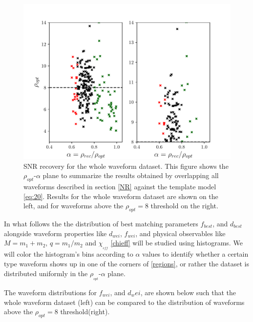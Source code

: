 \begin{figure}[hbt!]
\begin{center}
\includegraphics[width=\textwidth, angle=0]{images/Data_analysis/results/alpha_scatter.pdf}
\captionsetup{width=0.8\textwidth}
\caption[SNR recovery for the whole waveform dataset]{SNR recovery for the whole waveform dataset. This figure shows the $\rho_{opt}$-$\alpha$ plane to summarize the results obtained by overlapping all waveforms described in section \ref{NR} against the template model \ref{eq:20}. Results for the whole waveform dataset are shown on the left, and for waveforms above the $\rho_{opt}=8$ threshold on the right.}
\label{ascatter}
\end{center}
\end{figure}

\FloatBarrier

In what follows the the distribution of best matching parameters $f_{best}$, and $d_{best}$ alongside waveform properties like  $d_{wei}$, $f_{wei}$, and physical observables like $M=m_1+m_2$, $q=m_1/m_2$ and $\chi_{_{eff}}$ \ref{chieff} will be studied using histograms. We will color the histogram's bins according to $\alpha$ values to identify whether a certain type waveform shows up in one of the corners of  \ref{regions}, or rather the dataset is distributed uniformly in the $\rho_{_{opt}}$-$\alpha$ plane.

\newpage

The waveform distributions for $f_{wei}$, and $d_wei$, are shown below such that the whole waveform dataset (left) can be compared to the distribution of waveforms above the $\rho_{opt}=8$ threshold(right).

